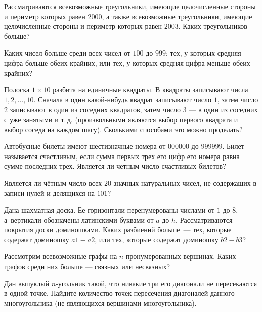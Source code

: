 \resetproblem \begingroup %
    \def\jeolmdate{07 ноября 2018 г.}%
    \def\jeolmauthors{}%
\jeolmheader \endgroup


\begin{problems}

\item Рассматриваются всевозможные треугольники, имеющие целочисленные стороны и периметр которых равен $2000$, а также всевозможные треугольники, имеющие целочисленные стороны и периметр которых равен $2003$. Каких треугольников больше? 

\item Каких чисел больше среди всех чисел от $100$ до $999$: тех, у которых средняя цифра больше обеих крайних, или тех, у которых средняя цифра меньше обеих крайних?

\item Полоска $1\times 10$ разбита на единичные квадраты. В квадраты записывают числа $1, 2, \dots, 10$. Сначала в один какой-нибудь квадрат записывают число $1$, затем число $2$ записывают в один из соседних квадратов, затем число $3$ --- в один из соседних с уже занятыми и т.\,д. (произвольными являются выбор первого квадрата и выбор соседа на каждом шагу). Сколькими способами это можно проделать?

\item \subproblem Автобусные билеты имеют шестизначные номера от $000000$ до $999999$. Билет называется счастливым, если сумма первых трех его цифр его номера равна сумме последних трех. Является ли четным число счастливых билетов?

\subproblem Является ли чётным число всех $20$-значных натуральных чисел, не содержащих в записи нулей и делящихся на $101$?

\item Дана шахматная доска. Ее горизонтали перенумерованы числами от $1$ до $8$, а~вертикали обозначены латинскими буквами от $a$ до $h$. Рассматриваются покрытия доски доминошками. Каких разбиений больше~--- тех, которые содержат доминошку $a1-a2$, или тех, которые содержат доминошку $b2-b3$?

\item Рассмотрим всевозможные графы на $n$ пронумерованных вершинах. Каких графов среди них больше --- связных или несвязных?

\item Дан выпуклый $n$-угольник такой, что никакие три его диагонали не пересекаются в одной точке. Найдите количество точек пересечения диагоналей данного многоугольника (не являющихся вершинами многоугольника).



\end{problems}
